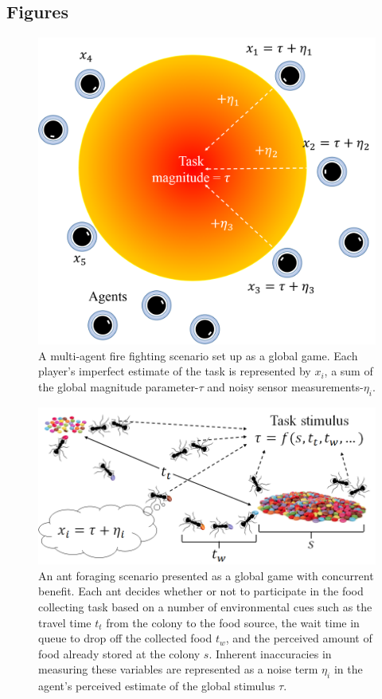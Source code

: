 \documentclass[12pt]{article}
\begin{document}


\newpage
\subsection*{Figures}
\begin{figure}[!ht]
	\centering\includegraphics[width=\columnwidth]{figures/firefighting.png}
	\centering\caption{A multi-agent fire fighting scenario set up as a global game. Each player's imperfect estimate of the task is represented by $x_i$, a sum of the global magnitude parameter-$\tau$ and noisy sensor measurements-$\eta_i$.}\vspace{-10px}
\end{figure}

\newpage
\begin{figure}[!ht]
	\centering\includegraphics[width=\columnwidth]{figures/foraging.png}
	\centering\caption{An ant foraging scenario presented as a global game with concurrent benefit. Each ant decides whether or not to participate in the food collecting task based on a number of environmental cues such as the travel time $t_t$ from the colony to the food source, the wait time in queue to drop off the collected food $t_w$, and the perceived amount of food already stored at the colony $s$. Inherent inaccuracies in measuring these variables are represented as a noise term $\eta_i$ in the agent’s perceived estimate of the global stimulus $\tau$.
}\label{fig:thm2fig}
\end{figure}
\end{document}
